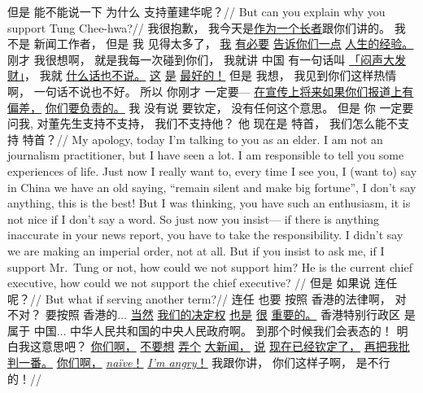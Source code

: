 \endgl
\xe
\ex[glhangstyle=none, everygla=\rm, exnoformat=X:, exno={\smallcaps{jo}}, belowexskip=0pt, aboveexskip=-.5cm]
\begingl
\gla
{但是} {能不能说一下} {为什么} {支持董建华呢？}//
\glb
{But} {can you explain} {why} {you support Tung Chee-hwa?}//
\endgl
\xe
\ex[glhangstyle=none, everygla=\rm, exnoformat=X:, exno={\smallcaps{ji}}, belowexskip=0pt, aboveexskip=-.5cm]
\begingl
\gla
{我很抱歉，} {我今天是\underline{作为一个长者}跟你们讲的。} {我} {不是} {新闻工作者，} {但是} {我} {见得太多了，} {\underline{我}} {\underline{有必要}} {\underline{告诉你们一点}} {\underline{人生的经验。}} {刚才} {我很想啊，} {就是我每一次碰到你们，} {我就讲} {中国} {有一句话叫} {\underline{「闷声大发财」}，} {我就} {\underline{什么话也不说。}} {\underline{这}} {\underline{是}} {\underline{最好的！}} {但是} {我想，} {我见到你们这样热情啊，} {一句话不说也不好。} {所以} {你刚才} {一定要---} {\underline{在宣传上将来如果你们报道上有偏差，}} {\underline{你们要负责的。}} {我} {没有说} {要钦定，} {没有任何这个意思。} {但是} {你} {一定要} {问我,} {对董先生支持不支持，} {我们不支持他？} {他} {现在是} {特首，} {我们怎么能不支持} {特首？}//
\glb
{My apology,} {today I'm talking to you as an elder.} {I} {am not} {an journalism practitioner,} {but} {I} {have seen a lot.} {I} {am responsible} {to tell you some} {experiences of life.} {Just now} {I really want to,} {every time I see you,} {I (want to) say} {in China} {we have an old saying,} {``remain silent and make big fortune'',} {I} {don't say anything,} {this} {is} {the best!} {But} {I was thinking,} {you have such an enthusiasm,} {it is not nice if I don't say a word.} {So} {just now you} {insist---} {if there is anything inaccurate in your news report,} {you have to take the responsibility.} {I} {didn't say} {we are making an imperial order,} {not at all.} {But} {if you} {insist to} {ask me,} {if I support Mr.\ Tung or not,} {how could we not support him?} {He} {is the current} {chief executive,} {how could we not support} { the chief executive? }//
\endgl
\xe
\ex[glhangstyle=none, everygla=\rm, exnoformat=X:, exno={\smallcaps{jo}}, belowexskip=0pt, aboveexskip=-.5cm]
\begingl
\gla
{但是} {如果说} {连任呢？}//
\glb
{But} {what if} {serving another term?}//
\endgl
\xe
\ex[glhangstyle=none, everygla=\rm, exnoformat=X:, exno={\smallcaps{ji}}, belowexskip=0pt, aboveexskip=-.5cm]
\begingl
\gla
{连任} {也要} {按照} {香港的法律啊，} {对不对？} {要按照} {香港的$\ldots$} {\underline{当然}} {\underline{我们的决定权}} {\underline{也是}} {\underline{很}} {\underline{重要的。}} {香港特别行政区} {是属于} {中国$\ldots$} {中华人民共和国的中央人民政府啊。} {到那个时候我们会表态的！} {明白我这意思吧？} {\underline{你们啊，}} {\underline{不要想}} {\underline{弄个}} {\underline{大新闻，}} {\underline{说}} {\underline{现在已经钦定了，}} {\underline{再把我批判一番。}} {\underline{你们啊，}} {\underline{\textit{na\"{i}ve}！}} {\underline{\textit{I'm angry}！}} {我跟你讲，} {你们这样子啊，} {是不行的！}//
